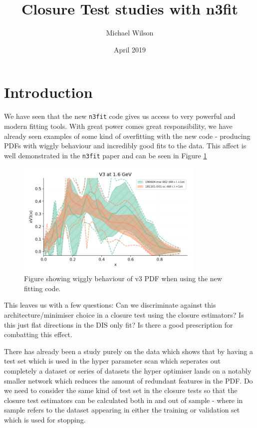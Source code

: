 \documentclass[a4paper]{article}
\title{Closure Test studies with n3fit}
\author{Michael Wilson}
\date{April 2019}
\newcommand{\nfit}{ \texttt{n3fit} }
\begin{document}
\maketitle

\section{Introduction}

We have seen that the new \nfit code gives us access to very powerful and
modern fitting tools. With great power comes great responsibility, we have already
seen examples of some kind of overfitting with the new code - producing PDFs
with wiggly behaviour and incredibly good fits to the data. This affect is
well demonstrated in the \nfit paper and can be seen in Figure \ref{fig:v3pdf}

\begin{figure}[!h]
    \centering
    \includegraphics[width=0.8\textwidth]{plot_pdfs_V3.png}
    \caption{
        Figure showing wiggly behaviour of v3 PDF when using the new fitting code.
        }
    \label{fig:v3pdf}
\end{figure}

This leaves us with a few questions: Can we discriminate against this
architecture/minimiser choice in a closure test using the closure estimators?
Is this just flat directions in the DIS only fit? Is there a good prescription
for combatting this effect.

There has already been a study purely on the data which shows that by having a test
set which is used in the hyper parameter scan which seperates out completely a dataset
or series of datasets the hyper optimiser lands on a notably smaller network which reduces
the amount of redundant features in the PDF. Do we need to consider the same kind of test
set in the closure tests so that the closure test estimators can be calculated both in and
out of sample - where in sample refers to the dataset appearing in either the training
or validation set which is used for stopping.
\end{document}
